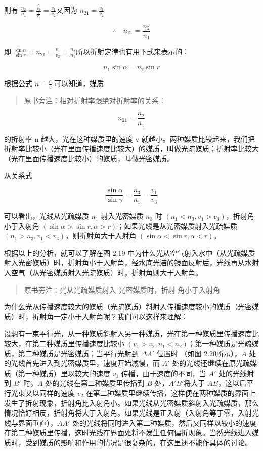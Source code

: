 则有
\(\frac{n_2}{n_1} = \frac{\frac{c}{v_2}}{\frac{c}{v_1}} = \frac{v_1}{v_2}\)又因为
\(n_{21} = \frac{v_1}{v_2}\)

\[
\therefore \quad n _ {21} = \frac {n _ {2}}{n _ {1}}
\]

即
\(\frac{\sin\alpha}{\sin r} = n_{21} = \frac{v_1}{v_2} = \frac{n_2}{n_1}\)所以折射定律也有用下式来表示的：

\[
n _ {1} \sin \alpha = n _ {2} \sin r
\]

根据公式 \(n = \frac{c}{v}\) 可以知道，媒质

\begin{quote}
原书旁注：相对折射率跟绝对折射率的关系：
\end{quote}

\[
n _ {21} = \frac {n _ {2}}{n _ {1}}
\]

的折射率 n 越大，光在这种媒质里的速度 v
就越小。两种媒质比较起来，我们把折射率比较小（光在里面传播速度比较大）的媒质，叫做光疏媒质；折射率比较大（光在里面传播速度比较小）的媒质，叫做光密媒质。

从关系式

\[
\frac {\sin \alpha}{\sin \gamma} = \frac {n _ {3}}{n _ {1}} = \frac {v _ {1}}{v _ {3}}
\]

可以看出，光线从光疏媒质 \(n_1\) 射入光密媒质 \(n_3\) 时
\((n_1 < n_3, v_1 > v_3)\)，折射角小于入射角
\((\sin \alpha > \sin r, \alpha > r)\)；如果光线是从光密媒质射入光疏媒质
\((n_1 > n_3, v_1 < v_3)\)，则折射角大于入射角
\((\sin \alpha < \sin r, \alpha < r)\)。

根据以上的分析，就可以了解在图 2.19
中为什么光从空气射入水中（从光疏媒质射入光密媒质）时，折射角小于入射角，经水底光洁的镜面反射后，光线再从水射入空气（从光密媒质射入光疏媒质）时，折射角则大于入射角。

\begin{quote}
原书旁注：光从光疏媒质射入 光密媒质时，折射 角小于入射角
\end{quote}

为什么光从传播速度较大的媒质（光疏媒质）斜射入传播速度较小的媒质（光密媒质）时，折射角一定小于入射角呢？我们可以这样来理解：

设想有一束平行光，从一种媒质斜射入另一种媒质，光在第一种媒质里传播速度比较大，在第二种媒质里传播速度比较小
\((v_{1} > v_{2}, n_{1} < n_{2})\)；第一种媒质是光疏媒质，第二种媒质是光密媒质；当平行光射到
\(\Delta A'\) 位置时 （如图 2.20所示），\(A\)
处的光线首先进入到光密媒质里，速度开始减慢，而 \(A'\)
处的光线还继续在原光疏媒质（第一种媒质）里以较大的速度 \(v_{1}\)
传播，由于速度的不同，当 \(A'\) 处的光线射到 \(B'\) 时，\(A\)
处的光线在第二种媒质里传播到 \(B\) 处，\(A'B'\)将大于
\(AB\)，这以后平行光束又以同样的速度 \(v_{2}\)
在第二种媒质里继续传播，这样便在两种媒质的界面上发生了折射现象，折射角比入射角小。如果光线从光密媒质斜射入光疏媒质，那么情况恰好相反，折射角将大于入射角。如果光线是正入射（入射角等于零，入射光线与界面垂直），\(AA'\)
处的光线将同时进入第二种媒质，然后又同样以较小的速度在第二种媒质里传播，这时光线在界面处将不发生任何偏折现象。当然光线进入媒质时，受到媒质的影响和作用的情况是很复杂的，在这里还不能作具体的讨论。


